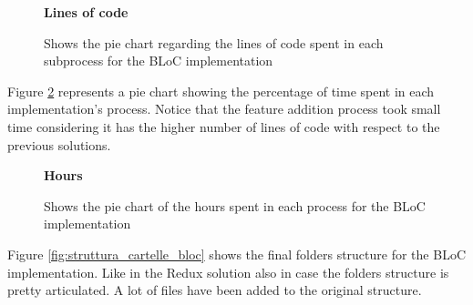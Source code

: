 \begin{figure}[H]

\caption*{\textbf{Lines of code}}
\centering
{}
 \caption{Shows the pie chart regarding the lines of code spent in each subprocess for the BLoC implementation}
 \label{image:bloc_lines_piechart}
\end{figure}
Figure \ref{image:bloc_hours_piechart} represents a pie chart showing the percentage of time spent in each implementation's process. Notice that the feature addition process took small time considering it has the higher number of lines of code with respect to the previous solutions.

\begin{figure}[H]
 \caption*{\textbf{Hours}}
\centering
{}
 \caption{Shows the pie chart of the hours spent in each process for the BLoC implementation}
 \label{image:bloc_hours_piechart}
\end{figure}

Figure \ref{fig:struttura_cartelle_bloc} shows the final folders structure for the BLoC implementation. Like in the Redux solution also in case the folders structure is pretty articulated. A lot of files have been added to the original structure.

